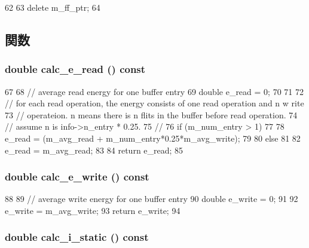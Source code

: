 \begin{DoxyCode}
62 {
63     delete m_ff_ptr;
64 }
\end{DoxyCode}


\subsection{関数}
\hypertarget{classRegister_a160510652e19b516f4efd9395964bd75}{
\subsubsection[{calc\_\-e\_\-read}]{\setlength{\rightskip}{0pt plus 5cm}double calc\_\-e\_\-read () const}}
\label{classRegister_a160510652e19b516f4efd9395964bd75}



\begin{DoxyCode}
67 {
68     // average read energy for one buffer entry
69     double e_read = 0;
70 
71 
72     // for each read operation, the energy consists of one read operation and n w
      rite
73     // operateion. n means there is n flits in the buffer before read operation.
74     // assume n is info->n_entry * 0.25.
75     // 
76     if (m_num_entry > 1)
77     {
78         e_read = (m_avg_read + m_num_entry*0.25*m_avg_write);
79     }
80     else
81     {
82         e_read = m_avg_read;
83     }
84     return e_read;
85 }
\end{DoxyCode}
\hypertarget{classRegister_ae7d5598c1aa5b953a944caba3d98bdba}{
\subsubsection[{calc\_\-e\_\-write}]{\setlength{\rightskip}{0pt plus 5cm}double calc\_\-e\_\-write () const}}
\label{classRegister_ae7d5598c1aa5b953a944caba3d98bdba}



\begin{DoxyCode}
88 {
89     // average write energy for one buffer entry
90     double e_write = 0;
91 
92     e_write = m_avg_write;
93     return e_write;
94 }
\end{DoxyCode}
\hypertarget{classRegister_aad1d8e72e5083614a20373b700754f6a}{
\subsubsection[{calc\_\-i\_\-static}]{\setlength{\rightskip}{0pt plus 5cm}double calc\_\-i\_\-static () const}}
\label{classRegister_aad1d8e72e5083614a20373b700754f6a}



